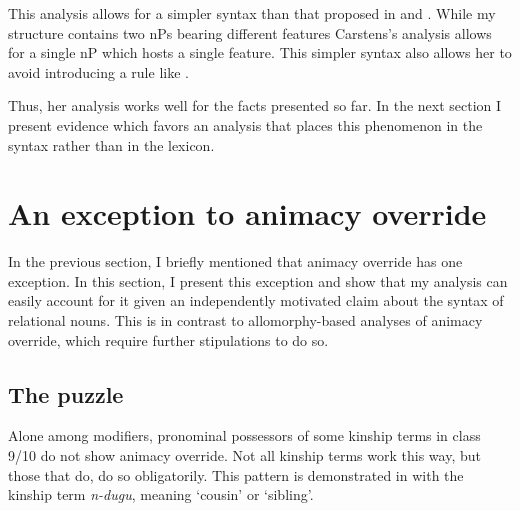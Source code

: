 \documentclass[output=paper,newtxmath,modfonts,nonflat,hidelinks]{langsci/langscibook}
\begin{document}
This analysis allows for a simpler syntax than that proposed in  and .  While my structure contains two nPs bearing different  features \linebreak Carstens's analysis allows for a single nP which hosts a single  feature.  This simpler syntax also allows her to avoid introducing a rule like .  

Thus, her analysis works well for the facts presented so far. In the next section I present evidence which favors an analysis that places this phenomenon in the syntax rather than in the lexicon.

\section{An exception to animacy override} \label{sec:pesetsky:exceptiontoAO}

 
In the previous section, I briefly mentioned that animacy override has one exception.  In this section, I present this exception and show that my analysis can easily account for it given an independently motivated claim about the syntax of  relational nouns. This is in contrast to allomorphy-based analyses of animacy override, which require further stipulations to do so.
 
\subsection{The puzzle} \label{sec:pesetsky:puzzlesection}
 
Alone among modifiers, pronominal possessors of some kinship terms in class 9/10 do not show animacy override. Not all kinship terms work this way, but those that do, do so obligatorily.  This pattern is demonstrated in  with the kinship term \textit{n-dugu}, meaning `cousin' or `sibling'.
   
\ea\label{ex:pesetsky:contrast} 
      
   \z \z 
\end{document}
